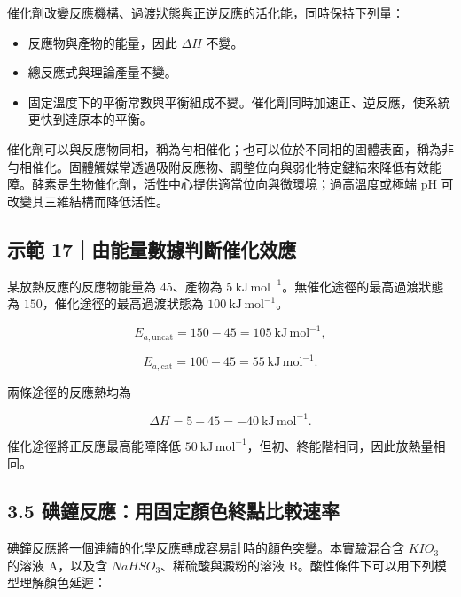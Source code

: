 \documentclass[11pt,a4paper]{article}
\providecommand{\tightlist}{%
  \setlength{\itemsep}{0pt}\setlength{\parskip}{0pt}}
\begin{document}
催化劑改變反應機構、過渡狀態與正逆反應的活化能，同時保持下列量：

\begin{itemize}
\tightlist
\item
  反應物與產物的能量，因此 \(\Delta H\) 不變。
\item
  總反應式與理論產量不變。
\item
  固定溫度下的平衡常數與平衡組成不變。催化劑同時加速正、逆反應，使系統更快到達原本的平衡。
\end{itemize}

催化劑可以與反應物同相，稱為勻相催化；也可以位於不同相的固體表面，稱為非勻相催化。固體觸媒常透過吸附反應物、調整位向與弱化特定鍵結來降低有效能障。酵素是生物催化劑，活性中心提供適當位向與微環境；過高溫度或極端 pH 可改變其三維結構而降低活性。

\begin{HandoutWorkedExample}

\subsection{示範 17｜由能量數據判斷催化效應}\label{ux793aux7bc4-17ux7531ux80fdux91cfux6578ux64daux5224ux65b7ux50acux5316ux6548ux61c9}

某放熱反應的反應物能量為 \(45\)、產物為 \(5\ \mathrm{kJ\,mol^{-1}}\)。無催化途徑的最高過渡狀態為 \(150\)，催化途徑的最高過渡狀態為 \(100\ \mathrm{kJ\,mol^{-1}}\)。

\[
E_{a,\mathrm{uncat}}=150-45=105\ \mathrm{kJ\,mol^{-1}},
\]

\[
E_{a,\mathrm{cat}}=100-45=55\ \mathrm{kJ\,mol^{-1}}.
\]

兩條途徑的反應熱均為

\[
\Delta H=5-45=-40\ \mathrm{kJ\,mol^{-1}}.
\]

催化途徑將正反應最高能障降低 \(50\ \mathrm{kJ\,mol^{-1}}\)，但初、終能階相同，因此放熱量相同。

\end{HandoutWorkedExample}

\subsection{3.5 碘鐘反應：用固定顏色終點比較速率}\label{ux7898ux9418ux53cdux61c9ux7528ux56faux5b9aux984fux8272ux7d42ux9edeux6bd4ux8f03ux901fux7387}

碘鐘反應將一個連續的化學反應轉成容易計時的顏色突變。本實驗混合含 \(KIO_3\) 的溶液 A，以及含 \(NaHSO_3\)、稀硫酸與澱粉的溶液 B。酸性條件下可以用下列模型理解顏色延遲：
\end{document}
